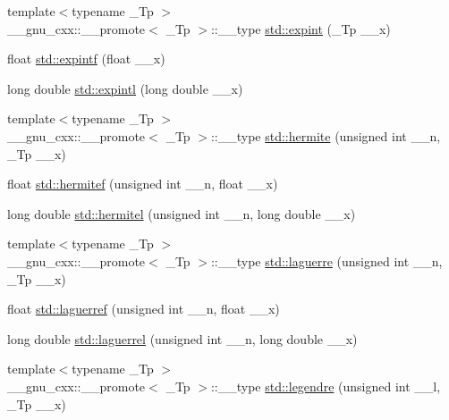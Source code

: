 \begin{DoxyCompactItemize}
{\footnotesize template$<$typename \+\_\+\+Tp $>$ }\\\+\_\+\+\_\+gnu\+\_\+cxx\+::\+\_\+\+\_\+promote$<$ \+\_\+\+Tp $>$\+::\+\_\+\+\_\+type \hyperlink{group__tr29124__math__spec__func_ga88ba17f5d050a6973ca4db1bf6e90590}{std\+::expint} (\+\_\+\+Tp \+\_\+\+\_\+x)
\item 
float \hyperlink{group__tr29124__math__spec__func_ga5842816f6eed2594e0a327df4e4a2a47}{std\+::expintf} (float \+\_\+\+\_\+x)
\item 
long double \hyperlink{group__tr29124__math__spec__func_ga1329130b32328d0666e290ee5931fa4f}{std\+::expintl} (long double \+\_\+\+\_\+x)
\item 
{\footnotesize template$<$typename \+\_\+\+Tp $>$ }\\\+\_\+\+\_\+gnu\+\_\+cxx\+::\+\_\+\+\_\+promote$<$ \+\_\+\+Tp $>$\+::\+\_\+\+\_\+type \hyperlink{group__tr29124__math__spec__func_ga97632b8bf77c323b2369e8d327965bdf}{std\+::hermite} (unsigned int \+\_\+\+\_\+n, \+\_\+\+Tp \+\_\+\+\_\+x)
\item 
float \hyperlink{group__tr29124__math__spec__func_ga94dae7444bb349e33057a92932db8abe}{std\+::hermitef} (unsigned int \+\_\+\+\_\+n, float \+\_\+\+\_\+x)
\item 
long double \hyperlink{group__tr29124__math__spec__func_ga21f8e312ee3e65286f86bf141b0f32e0}{std\+::hermitel} (unsigned int \+\_\+\+\_\+n, long double \+\_\+\+\_\+x)
\item 
{\footnotesize template$<$typename \+\_\+\+Tp $>$ }\\\+\_\+\+\_\+gnu\+\_\+cxx\+::\+\_\+\+\_\+promote$<$ \+\_\+\+Tp $>$\+::\+\_\+\+\_\+type \hyperlink{group__tr29124__math__spec__func_gacae65579b397fddcd27954380d364a58}{std\+::laguerre} (unsigned int \+\_\+\+\_\+n, \+\_\+\+Tp \+\_\+\+\_\+x)
\item 
float \hyperlink{group__tr29124__math__spec__func_gada763419b0e21b38e38daa8b6eb56a8c}{std\+::laguerref} (unsigned int \+\_\+\+\_\+n, float \+\_\+\+\_\+x)
\item 
long double \hyperlink{group__tr29124__math__spec__func_gaaf8b141edf9163b37ea4f2ed3e0191fc}{std\+::laguerrel} (unsigned int \+\_\+\+\_\+n, long double \+\_\+\+\_\+x)
\item 
{\footnotesize template$<$typename \+\_\+\+Tp $>$ }\\\+\_\+\+\_\+gnu\+\_\+cxx\+::\+\_\+\+\_\+promote$<$ \+\_\+\+Tp $>$\+::\+\_\+\+\_\+type \hyperlink{group__tr29124__math__spec__func_gaf6eac7fcb98e25b8f3f7d1b95fa7add8}{std\+::legendre} (unsigned int \+\_\+\+\_\+l, \+\_\+\+Tp \+\_\+\+\_\+x)

\end{DoxyCompactItemize}
